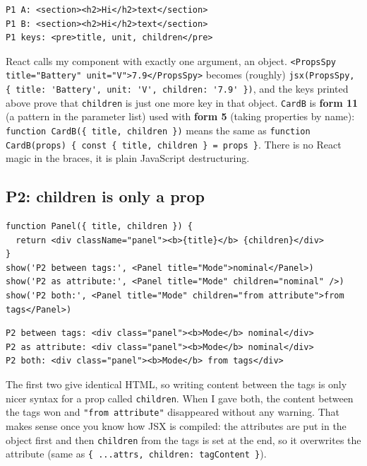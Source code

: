 \begin{lstlisting}
P1 A: <section><h2>Hi</h2>text</section>
P1 B: <section><h2>Hi</h2>text</section>
P1 keys: <pre>title, unit, children</pre>
\end{lstlisting}

React calls my component with exactly one argument, an object. \passthrough{\lstinline!<PropsSpy title="Battery" unit="V">7.9</PropsSpy>!} becomes (roughly) \passthrough{\lstinline!jsx(PropsSpy, \{ title: 'Battery', unit: 'V', children: '7.9' \})!}, and the keys printed above prove that \passthrough{\lstinline!children!} is just one more key in that object. \passthrough{\lstinline!CardB!} is \textbf{form 11} (a pattern in the parameter list) used with \textbf{form 5} (taking properties by name): \passthrough{\lstinline!function CardB(\{ title, children \})!} means the same as \passthrough{\lstinline!function CardB(props) \{ const \{ title, children \} = props \}!}. There is no React magic in the braces, it is plain JavaScript destructuring.

\hypertarget{p2-children-is-only-a-prop}{%
\subsection{P2: children is only a prop}\label{p2-children-is-only-a-prop}}

\begin{lstlisting}
function Panel({ title, children }) {
  return <div className="panel"><b>{title}</b> {children}</div>
}
show('P2 between tags:', <Panel title="Mode">nominal</Panel>)
show('P2 as attribute:', <Panel title="Mode" children="nominal" />)
show('P2 both:', <Panel title="Mode" children="from attribute">from tags</Panel>)
\end{lstlisting}

\begin{lstlisting}
P2 between tags: <div class="panel"><b>Mode</b> nominal</div>
P2 as attribute: <div class="panel"><b>Mode</b> nominal</div>
P2 both: <div class="panel"><b>Mode</b> from tags</div>
\end{lstlisting}

The first two give identical HTML, so writing content between the tags is only nicer syntax for a prop called \passthrough{\lstinline!children!}. When I gave both, the content between the tags won and \passthrough{\lstinline!"from attribute"!} disappeared without any warning. That makes sense once you know how JSX is compiled: the attributes are put in the object first and then \passthrough{\lstinline!children!} from the tags is set at the end, so it overwrites the attribute (same as \passthrough{\lstinline!\{ ...attrs, children: tagContent \}!}).

